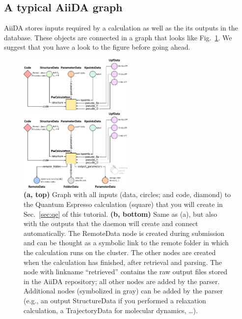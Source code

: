 \subsection{A typical AiiDA graph}
\label{sec:aiida_graph}
AiiDA stores inputs required by a calculation as well as the its outputs in the database. These objects are connected in a graph that looks like Fig.~\ref{fig:graph}. We suggest that you have a look to the figure before going ahead.

\begin{figure}
\centering
\includegraphics[width=0.5\textwidth]{img/graph/graph-inputonly}

\vspace {1cm}
 
\includegraphics[width=0.5\textwidth]{img/graph/graph-full}
\caption{\label{fig:graph}\textbf{(a, top)} Graph with all inputs (data, circles; and code, diamond) to the Quantum Espresso calculation (square) that you will create in Sec.~\ref{sec:qe} of this tutorial. \textbf{(b, bottom)} Same as (a), but also with the outputs that the daemon will create and connect automatically. The RemoteData node is created during submission and can be thought as a symbolic link to the remote folder in which the calculation runs on the cluster. The other nodes are created when the calculation has finished, after retrieval and parsing. The node with linkname ``retrieved'' contains the raw output files stored in the AiiDA repository; all other nodes are added by the parser. Additional nodes (symbolized in gray) can be added by the parser (e.g., an output StructureData if you performed a relaxation calculation, a TrajectoryData for molecular dynamics, \ldots).}
\end{figure}

